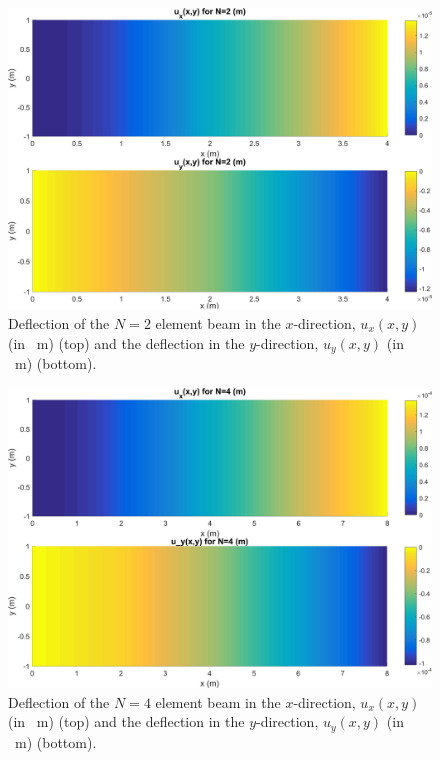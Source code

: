 \documentclass[11pt]{article}
\begin{document}
\begin{figure}[!htb]
  \centering
  \includegraphics[width=\linewidth]{q2b_uxuy_N2.png}
  \caption{Deflection of the $N=2$ element beam in the $x$-direction, $u_x(x,y)$ (in \SI{}{\m}) (top) and the deflection in the $y$-direction, $u_y(x,y)$ (in \SI{}{\m}) (bottom).}
  \label{fig:q2b_uxuy_N2}
\end{figure}

\begin{figure}[!htb]
  \centering
  \includegraphics[width=\linewidth]{q2b_uxuy_N4.png}
  \caption{Deflection of the $N=4$ element beam in the $x$-direction, $u_x(x,y)$ (in \SI{}{\m}) (top) and the deflection in the $y$-direction, $u_y(x,y)$ (in \SI{}{\m}) (bottom).}
  \label{fig:q2b_uxuy_N4}
\end{figure}
\end{document}

